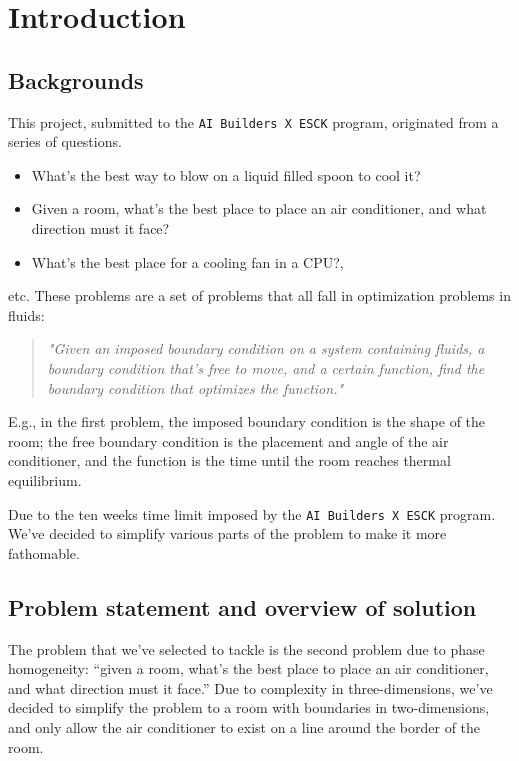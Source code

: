 \chapter{Introduction}

\section{Backgrounds}

This project, submitted to the \texttt{AI Builders X ESCK} program, originated from a series of questions.
\begin{itemize}
	\item What's the best way to blow on a liquid filled spoon to cool it?
	\item Given a room, what's the best place to place an air conditioner, and what direction must it face?
	\item What's the best place for a cooling fan in a CPU?,
\end{itemize}
etc. These problems are a set of problems that all fall in optimization problems in fluids:
\begin{quote}
	\emph{"Given an imposed boundary condition on a system containing fluids, a boundary condition that's free to move, and a certain function, find the boundary condition that optimizes the function."}
\end{quote}
E.g., in the first problem, the imposed boundary condition is the shape of the room; the free boundary condition is the placement and angle of the air conditioner, and the function is the time until the room reaches thermal equilibrium.

Due to the ten weeks time limit imposed by the \texttt{AI Builders X ESCK} program. We've decided to simplify various parts of the problem to make it more fathomable.

\section{Problem statement and overview of solution}

The problem that we've selected to tackle is the second problem due to phase homogeneity: \enquote{given a room, what's the best place to place an air conditioner, and what direction must it face.} Due to complexity in three-dimensions, we've decided to simplify the problem to a room with boundaries in two-dimensions, and only allow the air conditioner to exist on a line around the border of the room.

